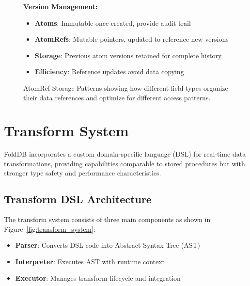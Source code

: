 \documentclass[11pt,a4paper]{article}
\begin{document}
\begin{figure}[htbp]
\vspace{0.5cm}

\textbf{Version Management:}
\begin{itemize}
\item \textbf{Atoms}: Immutable once created, provide audit trail
\item \textbf{AtomRefs}: Mutable pointers, updated to reference new versions
\item \textbf{Storage}: Previous atom versions retained for complete history
\item \textbf{Efficiency}: Reference updates avoid data copying
\end{itemize}

\caption{AtomRef Storage Patterns showing how different field types organize their data references and optimize for different access patterns.}
\label{fig:atomref_storage}
\end{figure}

\section{Transform System}

FoldDB incorporates a custom domain-specific language (DSL) for real-time data transformations, providing capabilities comparable to stored procedures but with stronger type safety and performance characteristics.

\subsection{Transform DSL Architecture}

The transform system consists of three main components as shown in Figure~\ref{fig:transform_system}:

\begin{itemize}
\item \textbf{Parser}: Converts DSL code into Abstract Syntax Tree (AST)
\item \textbf{Interpreter}: Executes AST with runtime context
\item \textbf{Executor}: Manages transform lifecycle and integration
\end{itemize}
\end{document}
